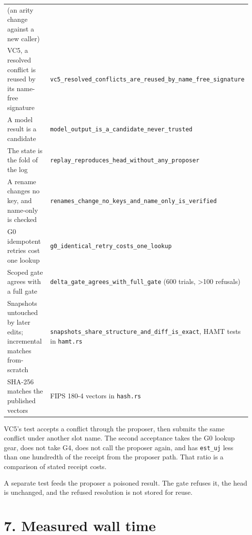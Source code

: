 \documentclass[10pt,letterpaper]{article}
\begin{document}
{{\begin{longtable}[]{@{}
  >{\raggedright\arraybackslash}p{}
  >{\raggedright\arraybackslash}p{}@{}}
(an arity change against a new caller) \\
VC5, a resolved conflict is reused by its name-free signature &
\texttt{vc5\_\allowbreak{}resolved\_\allowbreak{}conflicts\_\allowbreak{}are\_\allowbreak{}reused\_\allowbreak{}by\_\allowbreak{}name\_\allowbreak{}free\_\allowbreak{}signature} \\
A model result is a candidate &
\texttt{model\_\allowbreak{}output\_\allowbreak{}is\_\allowbreak{}a\_\allowbreak{}candidate\_\allowbreak{}never\_\allowbreak{}trusted} \\
The state is the fold of the log &
\texttt{replay\_\allowbreak{}reproduces\_\allowbreak{}head\_\allowbreak{}without\_\allowbreak{}any\_\allowbreak{}proposer} \\
A rename changes no key, and name-only is checked &
\texttt{renames\_\allowbreak{}change\_\allowbreak{}no\_\allowbreak{}keys\_\allowbreak{}and\_\allowbreak{}name\_\allowbreak{}only\_\allowbreak{}is\_\allowbreak{}verified} \\
G0 idempotent retries cost one lookup &
\texttt{g0\_\allowbreak{}identical\_\allowbreak{}retry\_\allowbreak{}costs\_\allowbreak{}one\_\allowbreak{}lookup} \\
Scoped gate agrees with a full gate &
\texttt{delta\_\allowbreak{}gate\_\allowbreak{}agrees\_\allowbreak{}with\_\allowbreak{}full\_\allowbreak{}gate} (600 trials,
\textgreater100 refusals) \\
Snapshots untouched by later edits; incremental matches from-scratch &
\texttt{snapshots\_\allowbreak{}share\_\allowbreak{}structure\_\allowbreak{}and\_\allowbreak{}diff\_\allowbreak{}is\_\allowbreak{}exact}, HAMT tests
in \texttt{hamt.rs} \\
SHA-256 matches the published vectors & FIPS 180-4 vectors in
\texttt{hash.rs} \\
\end{longtable}
}
}

VC5's test accepts a conflict through the proposer, then submits the
same conflict under another slot name. The second acceptance takes the
G0 lookup gear, does not take G4, does not call the proposer again, and
has \texttt{est\_uj} less than one hundredth of the receipt from the
proposer path. That ratio is a comparison of stated receipt costs.

A separate test feeds the proposer a poisoned result. The gate refuses
it, the head is unchanged, and the refused resolution is not stored for
reuse.

\section{7. Measured wall time}\label{measured-wall-time}
\end{document}
